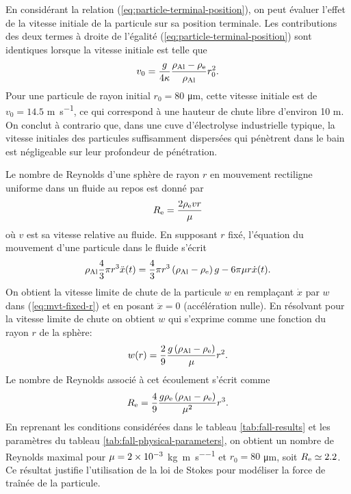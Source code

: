 \begin{remarque}
  En considérant la relation (\ref{eq:particle-terminal-position}), on
  peut évaluer l'effet de la vitesse initiale de la particule sur sa
  position terminale. Les contributions des deux termes à droite de
  l'égalité (\ref{eq:particle-terminal-position}) sont identiques
  lorsque la vitesse initiale est telle que
  \begin{equation*}
    v_0 = \frac{g}{4\kappa}\frac{\rho_\mathrm{Al} -
      \rho_\mathrm{e}}{\rho_\mathrm{Al}} r_0^2.
  \end{equation*}
  Pour une particule de rayon initial $r_0 = \num{80}$
  \si{\micro\meter}, cette vitesse initiale est de $v_0 = \num{14.5}$
  \si{\meter\per\second}, ce qui correspond à une hauteur de chute
  libre d'environ \num{10} \si{\meter}. On conclut à contrario que,
  dans une cuve d'électrolyse industrielle typique, la vitesse
  initiales des particules suffisamment dispersées qui pénètrent dans
  le bain est négligeable sur leur profondeur de pénétration.
\end{remarque}

\begin{remarque}
  Le nombre de Reynolds d'une sphère de rayon $r$ en mouvement
  rectiligne uniforme dans un fluide au repos est donné par
  \begin{equation*}
    R_{\mathrm e} = \frac{2 \rho_\mathrm{e} v r}{\mu}
  \end{equation*}
  où $v$ est sa vitesse relative au fluide.  En supposant $r$ fixé,
  l'équation du mouvement d'une particule dans le fluide s'écrit
  \begin{equation}\label{eq:mvt-fixed-r}
    \rho_\mathrm{Al} \frac{4}{3}\pi r^3 \ddot x(t) = \frac{4}{3}\pi
    r^3\left( \rho_\mathrm{Al} - \rho_\mathrm{e} \right)g -
  6\pi\mu r\dot x(t).
  \end{equation}
  On obtient la vitesse limite de chute de la particule $w$ en
  remplaçant $\dot x$ par $w$ dans (\ref{eq:mvt-fixed-r}) et en posant $\ddot x
  = 0$ (accélération nulle). En résolvant pour la vitesse limite de
  chute on obtient $w$ qui s'exprime comme une fonction du rayon $r$ de la sphère:
  \begin{equation}\label{eq:terminal-velocity}
    w(r) = \frac{2}{9}\frac{g\left( \rho_\mathrm{Al} - \rho_\mathrm{e} \right)}{\mu}r^2.
  \end{equation}
  Le nombre de Reynolds associé à cet écoulement s'écrit comme
  \begin{equation*}
    R_{\mathrm e} =
    \frac{4}{9}\frac{g\rho_\mathrm{e}\left( \rho_\mathrm{Al} - \rho_\mathrm{e} \right)}{\mu^2}r^3.
  \end{equation*}
  En reprenant les conditions considérées dans le tableau
  \ref{tab:fall-results} et les paramètres du tableau
  \ref{tab:fall-physical-parameters}, on obtient un nombre de Reynolds
  maximal pour $\mu = \num{2e-3}$
  \si{\kilo\gram\per\meter\per\second} et $r_0 = 80$
  \si{\micro\meter}, soit $R_{\mathrm e} \simeq 2.2$. Ce résultat justifie
  l'utilisation de la loi de Stokes pour modéliser la force de traînée
  de la particule.
\end{remarque}

